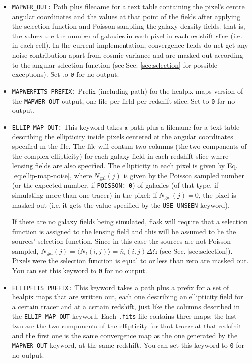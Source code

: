 \documentclass[12pt]{book} %
\newcommand{\nv}[1]{\mathrm{#1}}                 %
\begin{document}
\begin{itemize}
\item {\tt MAPWER\_OUT:} Path plus filename for a text table containing the pixel's 
  centre angular coordinates and the values at that point of the fields after applying 
  the selection function and Poisson sampling the galaxy density fields; that is, the 
  values are the number of galaxies in each pixel in each redshift slice (i.e. in each 
  cell). In the current implementation, convergence fields do not get any noise contribution 
  apart from cosmic variance and are masked out according to the angular selection 
  function (see Sec. \ref{sec:selection} for possible exceptions). Set to {\tt 0} for no output. 

\item {\tt MAPWERFITS\_PREFIX:} Prefix (including path) for the {\sc healpix} maps version 
  of the {\tt MAPWER\_OUT} output, one file per field per redshift slice. Set to {\tt 0} for no output. 

\item {\tt ELLIP\_MAP\_OUT:} This keyword takes a path plus a filename for a text table 
  describing the ellipticity inside pixels centered at the angular coordinates specified 
  in the file. The file will contain two columns (the two components of the complex 
  ellipticity) for each galaxy field in each redshift slice where lensing fields 
  are also specified. The ellipticity in each pixel is given by Eq. \ref{eq:ellip-map-noise}, 
  where $N_{\nv{gal}}(j)$ is given by the Poisson sampled number (or the expected number, if 
  {\tt POISSON: 0}) of galaxies (of that type, if simulating 
  more than one tracer) in the pixel; if $N_{\nv{gal}}(j)=0$, the pixel is masked out (i.e. it gets 
  the value specified by the {\tt USE\_UNSEEN} keyword). 

  If there are no galaxy fields being simulated, {\sc flask} will require that 
  a selection function is assigned to the lensing field and this will be assumed 
  to be the sources' selection function. Since in this case the sources are not Poisson 
  sampled, $N_{\nv{gal}}(j)=\langle N_t(i,j) \rangle = \bar{n}_t(i,j)\Delta\Omega$ 
  (see Sec. \ref{sec:selection}). Pixels were the selection function is equal to or 
  less than zero are masked out. You can set this keyword to {\tt 0} for no output.
  
\item {\tt ELLIPFITS\_PREFIX:} This keyword takes a path plus a prefix for a set of 
  {\sc healpix} maps that are written out, each one describing an ellipticity field for a certain tracer and 
  at a certain redshift, just like the columns described in the {\tt ELLIP\_MAP\_OUT} 
  keyword. Each {\tt .fits} file contains three maps: the last two are the two components 
  of the ellipticity for that tracer at that redsfhit and the first one is the same convergence map 
  as the one generated by the {\tt MAPWER\_OUT} keyword, at the same redshift. 
  You can set this keyword to {\tt 0} for no output.


\end{itemize}
\end{document}

